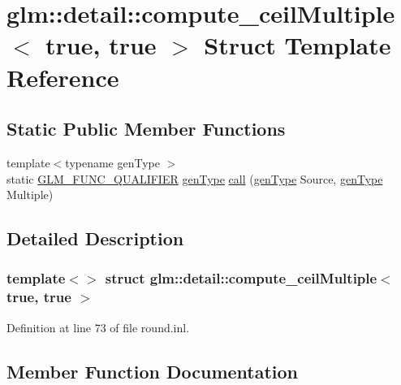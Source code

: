 \hypertarget{structglm_1_1detail_1_1compute__ceil_multiple_3_01true_00_01true_01_4}{}\section{glm\+::detail\+::compute\+\_\+ceil\+Multiple$<$ true, true $>$ Struct Template Reference}
\label{structglm_1_1detail_1_1compute__ceil_multiple_3_01true_00_01true_01_4}
\subsection*{Static Public Member Functions}
\begin{DoxyCompactItemize}
\item 
{\footnotesize template$<$typename gen\+Type $>$ }\\static \mbox{\hyperlink{setup_8hpp_a33fdea6f91c5f834105f7415e2a64407}{G\+L\+M\+\_\+\+F\+U\+N\+C\+\_\+\+Q\+U\+A\+L\+I\+F\+I\+ER}} \mbox{\hyperlink{structglm_1_1detail_1_1gen_type}{gen\+Type}} \mbox{\hyperlink{structglm_1_1detail_1_1compute__ceil_multiple_3_01true_00_01true_01_4_a6d9103207c947da13d0319d2d4d071d9}{call}} (\mbox{\hyperlink{structglm_1_1detail_1_1gen_type}{gen\+Type}} Source, \mbox{\hyperlink{structglm_1_1detail_1_1gen_type}{gen\+Type}} Multiple)
\end{DoxyCompactItemize}


\subsection{Detailed Description}
\subsubsection*{template$<$$>$\newline
struct glm\+::detail\+::compute\+\_\+ceil\+Multiple$<$ true, true $>$}



Definition at line 73 of file round.\+inl.



\subsection{Member Function Documentation}
\mbox{\label{structglm_1_1detail_1_1compute__ceil_multiple_3_01true_00_01true_01_4_a6d9103207c947da13d0319d2d4d071d9}} 
